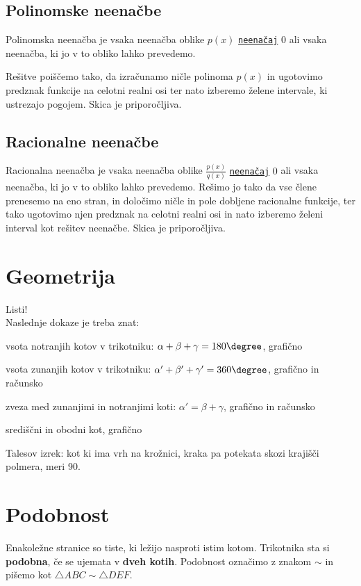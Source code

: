 \documentclass[a4paper,oneside,12pt,fleqn]{article}
\def\deg{\degree}
\numberwithin{equation}{section}
\newenvironment{enumerate*}%
{
\vspace{-12pt}%
\begin{enumerate}%
\setlength{\itemsep}{0pt}%
\setlength{\parskip}{2pt}}%
{\end{enumerate}}
\begin{document}
\subsection{Polinomske neenačbe}
\label{sec:neenac:pol}
Polinomska neenačba je vsaka neenačba oblike $p(x)$
\hyperlink{point:neenacaj}{\texttt{neenačaj}} $0$ ali vsaka
neenačba, ki jo v to obliko lahko prevedemo.

Rešitve poiščemo tako, da izračunamo ničle polinoma $p(x)$
in ugotovimo predznak funkcije na celotni realni osi ter nato
izberemo želene intervale, ki ustrezajo pogojem. Skica je priporočljiva.

\subsection{Racionalne neenačbe}
\label{sec:neenac:rac}
Racionalna neenačba je vsaka neenačba oblike $\frac{p(x)}{q(x)}$
\hyperlink{point:neenacaj}{\texttt{neenačaj}} $0$ ali
vsaka neenačba, ki jo v to obliko lahko prevedemo. Rešimo jo
tako da vse člene prenesemo na eno stran, in določimo ničle in pole dobljene racionalne
funkcije, ter tako ugotovimo njen predznak na celotni realni
osi in nato izberemo želeni interval kot rešitev neenačbe. Skica je priporočljiva.

\section{Geometrija}
\label{sec:geom}
Listi!\\
Naslednje dokaze je treba znat:
\begin{enumerate*}
  \item vsota notranjih kotov v trikotniku: $\alpha + \beta + \gamma = 180\deg$, grafično
  \item vsota zunanjih kotov v trikotniku: $\alpha' + \beta' + \gamma' = 360\deg$, grafično in računsko
  \item zveza med zunanjimi in notranjimi koti: $\alpha' = \beta + \gamma$, grafično in
    računsko \label{enum:geom:notrzun}
  \item središčni in obodni kot, grafično
  \item Talesov izrek: kot ki ima vrh na krožnici, kraka pa potekata skozi krajišči
    polmera, meri 90\deg.
\end{enumerate*}

\section{Podobnost}
\label{sec:podob}
Enakoležne stranice so tiste, ki ležijo nasproti istim kotom.
Trikotnika sta si \textbf{podobna}, če se ujemata v \textbf{dveh kotih}. Podobnost označimo  z
znakom $\sim$ in pišemo kot $\triangle ABC \sim \triangle DEF$.
\end{document}
